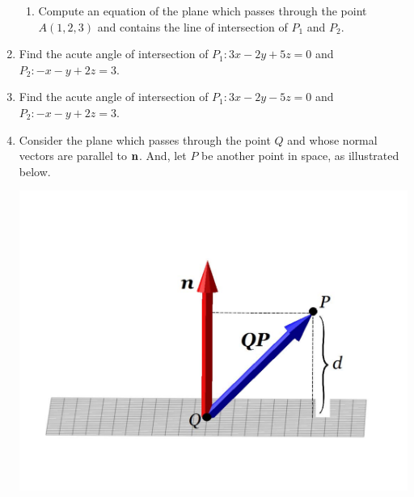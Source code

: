 \documentclass[12pt]{article}
\newif\ifans
\begin{document}
\begin{enumerate}
\begin{enumerate}
\item Compute an equation of the plane which passes through the point $A(1,2,3)$ and contains the line of intersection of $P_1$ and $P_2$.

\ifans{\fbox{$5(x-1)+4(y-2)+6(z-3)=0$}} \fi

\end{enumerate}

\item Find the acute angle of intersection of $P_1: 3x-2y+5z=0$ and $P_2: -x-y+2z=3$.

\ifans{\fbox{$\cos^{-1}\left(\frac{9}{\sqrt{38}\sqrt{6}}\right)$}} \fi

\item Find the acute angle of intersection of $P_1: 3x-2y-5z=0$ and $P_2: -x-y+2z=3$.

\ifans{\fbox{$\pi-\cos^{-1}\left(\frac{-11}{\sqrt{38}\sqrt{6}}\right)$; Detailed Solution: \textcolor{blue}{\href{http://www.math.drexel.edu/classes/Calculus/resources/Math200HW/Solutions/06_200_Planes_16.pdf}{Here}}}} \fi

\item Consider the plane which passes through the point $Q$ and whose normal vectors are parallel to ${\bf n}$.  And, let $P$ be another point in space, as illustrated below.

\begin{center}
\includegraphics[scale=0.5]{distance.pdf}
\end{center}

\begin{enumerate}


\end{enumerate}
\end{enumerate}
\end{document}
